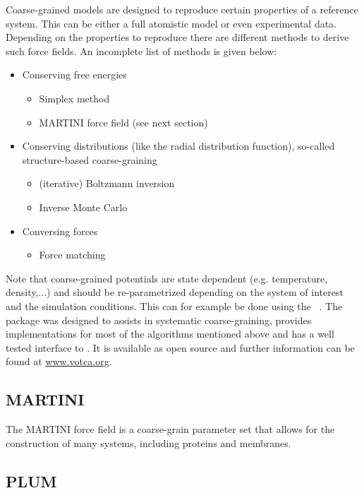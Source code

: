 Coarse-grained models are designed to reproduce certain properties of a reference system. This can be either a full atomistic model or even experimental data. Depending on the properties to reproduce there are different methods to derive such force fields. An incomplete list of methods is given below:
\begin{itemize}
\item Conserving free energies
\begin{itemize}
\item Simplex method
\item MARTINI force field (see next section)
\end{itemize}
\item Conserving distributions (like the radial distribution function), so-called structure-based coarse-graining
\begin{itemize}
\item (iterative) Boltzmann inversion
\item Inverse Monte Carlo
\end{itemize}
\item Conversing forces
\begin{itemize}
\item Force matching
\end{itemize}
\end{itemize}

Note that coarse-grained potentials are state dependent (e.g. temperature, density,...) and should be re-parametrized depending on the system of interest and the simulation conditions. This can for example be done using the ~\cite{ruehle2009}. The package was designed to assists in systematic coarse-graining, provides implementations for most of the algorithms mentioned above and has a well tested interface to {\gromacs}. It is available as open source and further information can be found at \href{http://www.votca.org}{www.votca.org}.

\subsection{MARTINI}

The MARTINI force field is a coarse-grain parameter set that allows for the construction 
of many systems, including proteins and membranes.

\subsection{PLUM}

